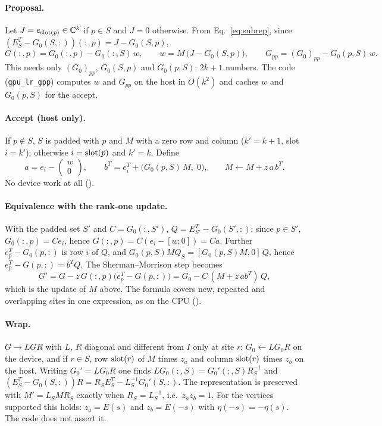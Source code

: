 \paragraph{Proposal.} Let $J=e_{{\rm slot}(p)}\in\mathbb{C}^k$ if $p\in S$ and $J=0$ otherwise. From Eq.~\eqref{eq:subrep}, since $(E_S^T-G_0(S,:))(:,p)=J-G_0(S,p)$,
\begin{equation}
G(:,p) = G_0(:,p) - G_0(:,S)\,w,\qquad w = M\,\bigl(J-G_0(S,p)\bigr),\qquad G_{pp} = (G_0)_{pp}-G_0(p,S)\,w .
\end{equation}
This needs only $(G_0)_{pp}$, $G_0(S,p)$ and $G_0(p,S)$: $2k+1$ numbers. The code (\texttt{gpu\_lr\_gpp}) computes $w$ and $G_{pp}$ on the host in $O(k^2)$ and caches $w$ and $G_0(p,S)$ for the accept.

\paragraph{Accept (host only).} If $p\notin S$, $S$ is padded with $p$ and $M$ with a zero row and column ($k'=k+1$, slot $i=k'$); otherwise $i={\rm slot}(p)$ and $k'=k$. Define
\begin{equation}
a = e_i - \begin{pmatrix} w\\0\end{pmatrix},\qquad b^T = e_i^T + \bigl(G_0(p,S)\,M,\;0\bigr),\qquad M\leftarrow M + z\,a\,b^T .
\end{equation}
No device work at all ().

\paragraph{Equivalence with the rank-one update.} With the padded set $S'$ and $C=G_0(:,S')$, $Q=E_{S'}^T-G_0(S',:)$: since $p\in S'$, $G_0(:,p)=Ce_i$, hence $G(:,p)=C(e_i-[w;0])=Ca$. Further $e_p^T-G_0(p,:)$ is row $i$ of $Q$, and $G_0(p,S)MQ_S = [G_0(p,S)M,0]\,Q$, hence $e_p^T-G(p,:)=b^TQ$. The Sherman--Morrison step becomes
\begin{equation}
G' = G - z\,G(:,p)\bigl(e_p^T-G(p,:)\bigr) = G_0 - C\,(M+z\,ab^T)\,Q ,
\end{equation}
which is the update of $M$ above. The formula covers new, repeated and overlapping sites in one expression, as on the CPU ().

\paragraph{Wrap.} $G\to LGR$ with $L$, $R$ diagonal and different from $I$ only at site $r$: $G_0\leftarrow LG_0R$ on the device, and if $r\in S$, row ${\rm slot}(r)$ of $M$ times $z_a$ and column ${\rm slot}(r)$ times $z_b$ on the host. Writing $G_0'=LG_0R$ one finds $LG_0(:,S)=G_0'(:,S)R_S^{-1}$ and $(E_S^T-G_0(S,:))R=R_SE_S^T-L_S^{-1}G_0'(S,:)$. The representation is preserved with $M'=L_SMR_S$ exactly when $R_S=L_S^{-1}$, i.e.\ $z_az_b=1$. For the vertices supported this holds: $z_a=E(s)$ and $z_b=E(-s)$ with $\eta(-s)=-\eta(s)$. The code does not assert it.

